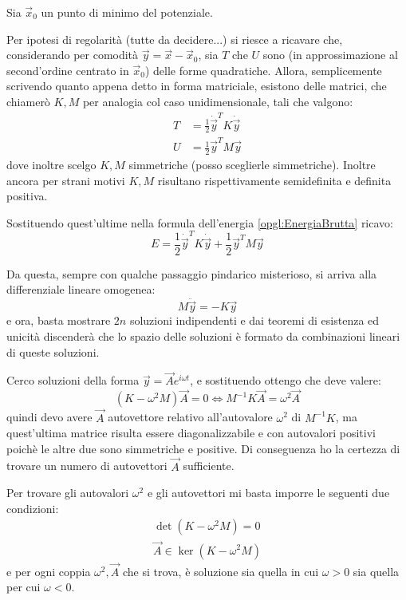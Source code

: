\documentclass[../main.tex]{subfiles}
\begin{document}
Sia $\vec x_0$ un punto di minimo del potenziale.

Per ipotesi di regolarità (tutte da decidere...) si riesce a ricavare che, considerando per comodità $\vec y=\vec x-\vec x_0$, sia $T$ che $U$ sono (in approssimazione al second'ordine centrato in $\vec x_0$) delle forme quadratiche. 
Allora, semplicemente scrivendo quanto appena detto in forma matriciale, esistono delle matrici, che chiamerò $K,M$ per analogia col caso unidimensionale, tali che valgono:
\begin{align*}
	T &= \frac 12\dot{\vec{y}}^T K \dot{\vec{y}} \\
	U &= \frac 12\vec{y}^T M \vec y
\end{align*}
dove inoltre scelgo $K,M$ simmetriche (posso sceglierle simmetriche). Inoltre ancora per strani motivi $K,M$ risultano rispettivamente semidefinita e definita positiva.

Sostituendo quest'ultime nella formula dell'energia \cref{opgl:EnergiaBrutta} ricavo:
\begin{equation}\label{opgl:Energia}
	E=\frac 12\dot{\vec{y}}^T K \dot{\vec{y}} + \frac 12\vec{y}^T M \vec y
\end{equation}

Da questa, sempre con qualche passaggio pindarico misterioso, si arriva alla differenziale lineare omogenea:
\begin{equation}\label{opgl:Fondamentale}
	M\ddot{\vec y}=-K\vec y
\end{equation}
e ora, basta mostrare $2n$ soluzioni indipendenti e dai teoremi di esistenza ed unicità discenderà che lo spazio delle soluzioni è formato da combinazioni lineari di queste soluzioni.

Cerco soluzioni della forma $\vec y=\vec A e^{i\omega t}$, e sostituendo ottengo che deve valere:
\begin{equation*}
	(K-\omega^2M)\vec A=0 \iff M^{-1}K\vec A=\omega^2\vec A
\end{equation*}
quindi devo avere $\vec A$ autovettore relativo all'autovalore $\omega^2$ di $M^{-1}K$, ma quest'ultima matrice risulta essere diagonalizzabile e con autovalori positivi poichè le altre due sono simmetriche e positive. Di conseguenza ho la certezza di trovare un numero di autovettori $\vec A$ sufficiente.

Per trovare gli autovalori $\omega^2$ e gli autovettori mi basta imporre le seguenti due condizioni:
\begin{gather}\label{opgl:SistemaSoluzioni}
	\det(K-\omega^2M)=0 \\
	\vec A\in \ker(K-\omega^2M)
\end{gather}
e per ogni coppia $\omega^2,\vec A$ che si trova, è soluzione sia quella in cui $\omega>0$ sia quella per cui $\omega<0$.
\end{document}
